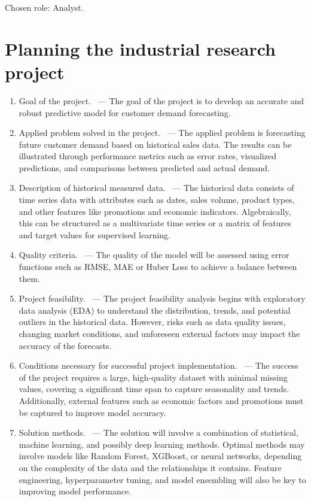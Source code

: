 \documentclass[12pt]{article}
\date{}
\begin{document}
\maketitle

Chosen role: Analyst.

\section{Planning the industrial research project}

\begin{enumerate}
\item Goal of the project. ~--- The goal of the project is to develop an accurate and robust predictive model for customer demand forecasting.
\item Applied problem solved in the project. ~--- The applied problem is forecasting future customer demand based on historical sales data. The results can be illustrated through performance metrics such as error rates, visualized predictions, and comparisons between predicted and actual demand.
\item Description of historical measured data. ~--- The historical data consists of time series data with attributes such as dates, sales volume, product types, and other features like promotions and economic indicators. Algebraically, this can be structured as a multivariate time series or a matrix of features and target values for supervised learning.
\item Quality criteria. ~--- The quality of the model will be assessed using error functions such as RMSE, MAE or Huber Loss to achieve a balance between them.
\item Project feasibility. ~--- The project feasibility analysis begins with exploratory data analysis (EDA) to understand the distribution, trends, and potential outliers in the historical data. However, risks such as data quality issues, changing market conditions, and unforeseen external factors may impact the accuracy of the forecasts.
\item Conditions necessary for successful project implementation. ~--- The success of the project requires a large, high-quality dataset with minimal missing values, covering a significant time span to capture seasonality and trends. Additionally, external features such as economic factors and promotions must be captured to improve model accuracy.
\item Solution methods. ~--- The solution will involve a combination of statistical, machine learning, and possibly deep learning methods. Optimal methods may involve models like Random Forest, XGBoost, or neural networks, depending on the complexity of the data and the relationships it contains. Feature engineering, hyperparameter tuning, and model ensembling will also be key to improving model performance.
\end{enumerate}
\end{document}
